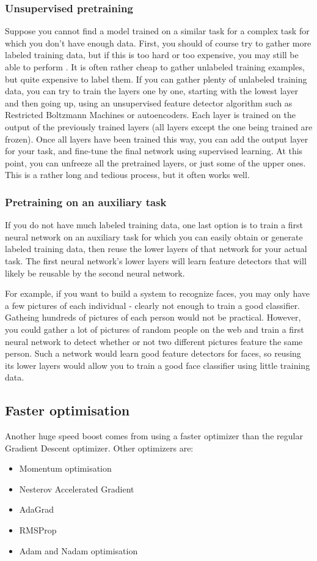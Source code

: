 \subsubsection{Unsupervised pretraining}
Suppose you cannot find a model trained on a similar task for a complex task for which you don't have enough data. First, you should of course try to gather more labeled training data, but if this is too hard or too expensive, you may still be able to perform .  It is often rather cheap to gather unlabeled training examples, but quite expensive to label them. If you can gather plenty of unlabeled training data, you can try to train the layers one by one, starting with the lowest layer and then going up, using an unsupervised feature detector algorithm such as Restricted Boltzmann Machines or autoencoders. Each layer is trained on the output of the previously trained layers (all layers except the one being trained are frozen). Once all layers have been trained this way, you can add the output layer for your task, and fine-tune the final network using supervised learning. At this point, you can unfreeze all the pretrained layers, or just some of the upper ones. This is a rather long and tedious process, but it often works well.

\subsubsection{Pretraining on an auxiliary task}
If you do not have much labeled training data, one last option is to train a first neural network on an auxiliary task for which you can easily obtain or generate labeled training data, then reuse the lower layers of that network for your actual task. The first neural network's lower layers will learn feature detectors that will likely be reusable by the second neural network.

For example, if you want to build a system to recognize faces, you may only have a few pictures of each individual - clearly not enough to train a good classifier. Gatheing hundreds of pictures of each person would not be practical. However, you could gather a lot of pictures of random people on the web and train a first neural network to detect whether or not two different pictures feature the same person. Such a network would learn good feature detectors for faces, so reusing its lower layers would allow you to train a good face classifier using little training data.

\subsection{Faster optimisation}
Another huge speed boost comes from using a faster optimizer than the regular Gradient Descent optimizer. Other optimizers are:
\begin{itemize}
\item Momentum optimisation
\item Nesterov Accelerated Gradient
\item AdaGrad
\item RMSProp
\item Adam and Nadam optimisation
\end{itemize}

